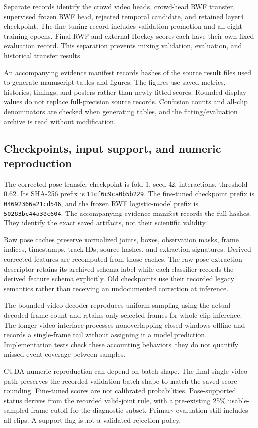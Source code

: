 \documentclass[journal]{IEEEtai}
\begin{document}
Separate records identify the crowd video heads, crowd-head RWF transfer, supervised frozen RWF head, rejected temporal candidate, and retained layer4 checkpoint. The fine-tuning record includes validation promotion and all eight training epochs. Final RWF and external Hockey scores each have their own fixed evaluation record. This separation prevents mixing validation, evaluation, and historical transfer results.

An accompanying evidence manifest records hashes of the source result files used to generate manuscript tables and figures. The figures use saved metrics, histories, timings, and posters rather than newly fitted scores. Rounded display values do not replace full-precision source records. Confusion counts and all-clip denominators are checked when generating tables, and the fitting/evaluation archive is read without modification.

\subsection{Checkpoints, input support, and numeric reproduction}
The corrected pose transfer checkpoint is fold 1, seed 42, interactions, threshold 0.62. Its SHA-256 prefix is \texttt{11cf6c9ca0b5b229}. The fine-tuned checkpoint prefix is \texttt{04692366a21cd546}, and the frozen RWF logistic-model prefix is \texttt{50283bc44a38c604}. The accompanying evidence manifest records the full hashes. They identify the exact saved artifacts, not their scientific validity.

Raw pose caches preserve normalized joints, boxes, observation masks, frame indices, timestamps, track IDs, source hashes, and extraction signatures. Derived corrected features are recomputed from those caches. The raw pose extraction descriptor retains its archived schema label while each classifier records the derived feature schema explicitly. Old checkpoints use their recorded legacy semantics rather than receiving an undocumented correction at inference.

The bounded video decoder reproduces uniform sampling using the actual decoded frame count and retains only selected frames for whole-clip inference. The longer-video interface processes nonoverlapping closed windows offline and records a single-frame tail without assigning it a model prediction. Implementation tests check these accounting behaviors; they do not quantify missed event coverage between samples.

CUDA numeric reproduction can depend on batch shape. The final single-video path preserves the recorded validation batch shape to match the saved score rounding. Fine-tuned scores are not calibrated probabilities. Pose-supported status derives from the recorded valid-joint rule, with a pre-existing 25\% usable-sampled-frame cutoff for the diagnostic subset. Primary evaluation still includes all clips. A support flag is not a validated rejection policy.
\end{document}
